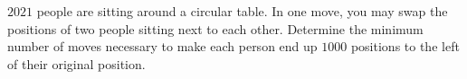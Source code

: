 $2021$ people are sitting around a circular table. In one move, you may swap the positions of two people sitting next to each other. Determine the minimum number of moves necessary to make each person end up $1000$ positions to the left of their original position.